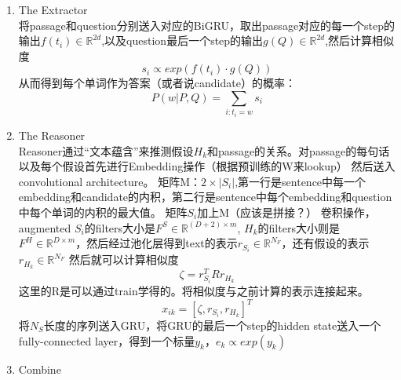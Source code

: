 \documentclass[a4paper,UTF8]{article}
\numberwithin{equation}{section}
\begin{document}
\begin{enumerate}
    \item The Extractor\\将passage和question分别送入对应的BiGRU，取出passage对应的每一个step的输出$f(t_i)\in \mathbb{R}^{2d}$,以及question最后一个step的输出$g(Q)\in \mathbb{R}^{2d}$,然后计算相似度
    $$s_i \propto exp(f(t_i)\cdot g(Q))$$从而得到每个单词作为答案（或者说candidate）的概率：$$P(w|P,Q)=\sum_{i:t_i=w}s_i$$
    \item The Reasoner\\Reasoner通过“文本蕴含”来推测假设$H_k$和passage的关系。对passage的每句话以及每个假设首先进行Embedding操作（根据预训练的W来lookup）
    然后送入convolutional architecture。
    \subitem{[1]} 矩阵M：$2 \times |S_i|$,第一行是sentence中每一个embedding和candidate的内积，第二行是sentence中每个embedding和question中每个单词的内积的最大值。
    \subitem{[2]} 矩阵$S_i$加上M（应该是拼接？）
    \subitem{[3]} 卷积操作，augmented $S_i$的filters大小是$F^S \in \mathbb{R}^{(D+2)\times m}$,
    $H_k$的filters大小则是$F^H \in \mathbb{R}^{D\times m}$，然后经过池化层得到text的表示$r_{S_i}\in \mathbb{R}^{N_F}$，还有假设的表示$r_{H_k}\in \mathbb{R}^{N_F}$
    然后就可以计算相似度$$\zeta = r_{S_i}^T R r_{H_k}$$这里的R是可以通过train学得的。将相似度与之前计算的表示连接起来。$$x_{ik}=[\zeta,r_{S_i},r_{H_k}]^T$$
    将$N_S$长度的序列送入GRU，将GRU的最后一个step的hidden state送入一个fully-connected layer，得到一个标量$y_k$，$e_k \propto exp(y_k)$
    \item Combine\\
    \begin{figure}[H]
        \centering
        \quad
    \end{figure}
\end{enumerate}
\end{document}
